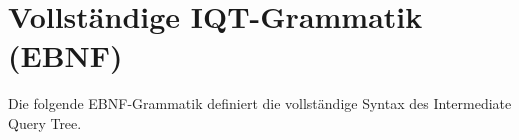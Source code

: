 ﻿%
\appendix
\section{Vollständige IQT-Grammatik (EBNF)}
\label{app:grammatik}

Die folgende EBNF-Grammatik definiert die vollständige Syntax des
Intermediate Query Tree.

